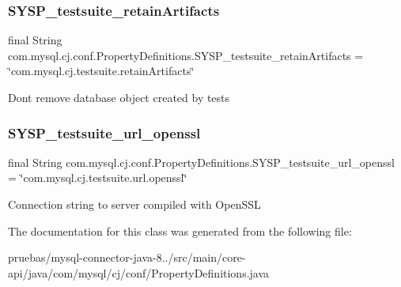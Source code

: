 \subsubsection{\texorpdfstring{S\+Y\+S\+P\+\_\+testsuite\+\_\+retain\+Artifacts}{SYSP\_testsuite\_retainArtifacts}}
{\footnotesize\ttfamily final String com.\+mysql.\+cj.\+conf.\+Property\+Definitions.\+S\+Y\+S\+P\+\_\+testsuite\+\_\+retain\+Artifacts = \char`\"{}com.\+mysql.\+cj.\+testsuite.\+retain\+Artifacts\char`\"{}\hspace{0.3cm}{\ttfamily [static]}}

Don\textquotesingle{}t remove database object created by tests \mbox{\label{classcom_1_1mysql_1_1cj_1_1conf_1_1_property_definitions_a423748df889d74615c27c2d95cdc9644}} 
\subsubsection{\texorpdfstring{S\+Y\+S\+P\+\_\+testsuite\+\_\+url\+\_\+openssl}{SYSP\_testsuite\_url\_openssl}}
{\footnotesize\ttfamily final String com.\+mysql.\+cj.\+conf.\+Property\+Definitions.\+S\+Y\+S\+P\+\_\+testsuite\+\_\+url\+\_\+openssl = \char`\"{}com.\+mysql.\+cj.\+testsuite.\+url.\+openssl\char`\"{}\hspace{0.3cm}{\ttfamily [static]}}

Connection string to server compiled with Open\+S\+SL 

The documentation for this class was generated from the following file\+:\begin{DoxyCompactItemize}
\item 
pruebas/mysql-\/connector-\/java-\/8../src/main/core-\/api/java/com/mysql/cj/conf/Property\+Definitions.\+java\end{DoxyCompactItemize}
